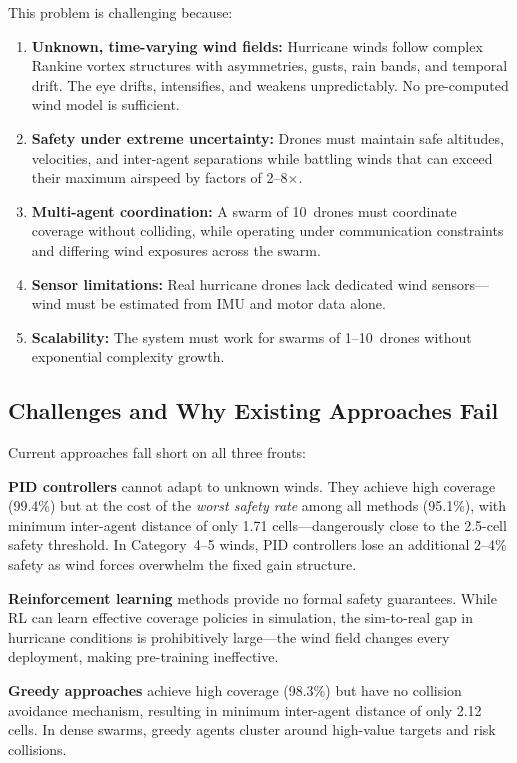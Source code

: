 \documentclass[12pt,a4paper,twocolumn]{article}
\begin{document}
This problem is challenging because:
\begin{enumerate}[leftmargin=*]
    \item \textbf{Unknown, time-varying wind fields:} Hurricane winds follow complex Rankine vortex structures with asymmetries, gusts, rain bands, and temporal drift. The eye drifts, intensifies, and weakens unpredictably. No pre-computed wind model is sufficient.
    \item \textbf{Safety under extreme uncertainty:} Drones must maintain safe altitudes, velocities, and inter-agent separations while battling winds that can exceed their maximum airspeed by factors of 2--8$\times$.
    \item \textbf{Multi-agent coordination:} A swarm of 10~drones must coordinate coverage without colliding, while operating under communication constraints and differing wind exposures across the swarm.
    \item \textbf{Sensor limitations:} Real hurricane drones lack dedicated wind sensors---wind must be estimated from IMU and motor data alone.
    \item \textbf{Scalability:} The system must work for swarms of 1--10~drones without exponential complexity growth.
\end{enumerate}

\subsection{Challenges and Why Existing Approaches Fail}
\label{sec:challenges_existing}

Current approaches fall short on all three fronts:

\textbf{PID controllers} \citep{Duggal2020} cannot adapt to unknown winds. They achieve high coverage (99.4\%) but at the cost of the \emph{worst safety rate} among all methods (95.1\%), with minimum inter-agent distance of only 1.71 cells---dangerously close to the 2.5-cell safety threshold. In Category~4--5 winds, PID controllers lose an additional 2--4\% safety as wind forces overwhelm the fixed gain structure.

\textbf{Reinforcement learning} methods \citep{PPO2017} provide no formal safety guarantees. While RL can learn effective coverage policies in simulation, the sim-to-real gap in hurricane conditions is prohibitively large---the wind field changes every deployment, making pre-training ineffective.

\textbf{Greedy approaches} achieve high coverage (98.3\%) but have no collision avoidance mechanism, resulting in minimum inter-agent distance of only 2.12 cells. In dense swarms, greedy agents cluster around high-value targets and risk collisions.
\end{document}
